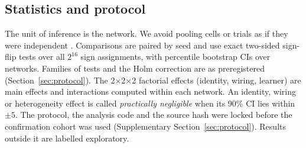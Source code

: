 \subsection{Statistics and protocol}
The unit of inference is the network. We avoid pooling cells or trials as if they were
independent \citep{aarts2014}. Comparisons are paired by seed and use exact two-sided sign-flip
tests over all $2^{16}$ sign assignments, with percentile bootstrap CIs over networks. Families of
tests and the Holm correction are as preregistered (Section~\ref{sec:protocol}). The 2$\times$2$\times$2
factorial effects (identity, wiring, learner) are main effects and interactions computed within
each network. An identity, wiring or heterogeneity effect is called \emph{practically negligible}
when its 90\% CI lies within $\pm5$\pp. The protocol, the analysis code and the source hash were
locked before the confirmation cohort was used (Supplementary Section~\ref{sec:protocol}). Results
outside it are labelled exploratory.
